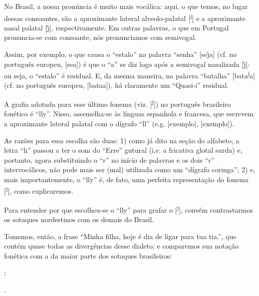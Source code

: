 \documentclass[12pt, a5paper, titlepage]{article}
\begin{document}
\begin{bilingualpages}
    No Brasil, a nossa pronúncia é muito mais vocálica: aqui, o que temos, no lugar dessas consoantes, são a aproximante lateral alveolo-palatal [\textsuperscript{j}] e a aproximante nasal palatal [\~\j], respectivamente. Em outras palavras, o que em Portugal pronuncia-se com consoante, nós pronunciamos com semivogal.
    
    Assim, por exemplo, o que causa o ``estalo'' na palavra ``senha'' [s\textprimstress e\~\j a] (cf. no português europeu, [s\textprimstress e\textltailn a]) é que o ``a'' se diz logo após a semivogal nasalizada [\~\j]: ou seja, o ``estalo'' é residual. E, da mesma maneira, na palavra ``batalha'' [bat\textprimstress a{\textsuperscript{j}}a] (cf. no português europeu, [bat\textprimstress a\textturny a]), há claramente um ``Quasi-i'' residual.

    A grafia adotada para esse último fonema (viz. [\textsuperscript{j}]) no português brasileiro fonético é ``lly''. Nisso, assemelha-se às línguas espanhola e francesa, que escrevem a aproximante lateral palatal com o dígrafo ``ll'' (e.g. [exemplo], [exemplo]).
    
    As razões para essa escolha são duas: 1) como já dito na seção do alfabeto, a letra ``h'' passou a ter o som do ``Erre'' gutural (i.e. a fricativa glotal surda) e, portanto, agora substituindo o ``r'' no início de palavras e os dois ``r'' intervocálicos, não pode mais ser (mal) utilizada como um ``dígrafo coringa''; 2) e, mais importantemente, o ``lly'' é, de fato, uma perfeita representação do fonema [\textsuperscript{j}], como explicaremos.

    Para entender por que escolheu-se o ``lly'' para grafar o [\textsuperscript{j}], convém contrastarmos os sotaques nordestinos com os demais do Brasil.
    
    Tomemos, então, a frase ``Minha filha, hoje é dia de ligar para tua tia.'', que contém quase todas as divergências desse dialeto; e comparemos sua notação fonética com a da maior parte dos sotaques brasileiros:
    \newline
    \par[
        m\textprimstress ĩa
        f\textprimstress i\textsubbar{l}\textsuperscript{j}a,
        \textprimstress\textopeno \textyogh i
        \textepsilon \
        d\textprimstress ia
        di
        lig\textprimstress ah
        p\textprimstress @\textfishhookr
        a
        t\textprimstress ua
        t\textprimstress ia.
    ];
    \par[
        m\textprimstress ĩa
        f\textprimstress i\textsubbar{l}\textsuperscript{j}a,
        \textprimstress o\textyogh i
        \textepsilon \
        \texttoptiebar{d\textyogh}\textprimstress ia
        \texttoptiebar{d\textyogh}i
        \textsubbar{l}\textsuperscript{j}ig\textprimstress ah
        p\textprimstress a\textfishhookr
        a
        t\textprimstress ua
        \texttoptiebar{t\textesh}\textprimstress ia.
    ].
    \newline


\end{bilingualpages}
\end{document}
